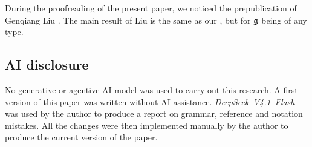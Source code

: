 During the proofreading of the present paper, we noticed the prepublication of Genqiang Liu \cite{liu2026root}. The main result of Liu is the same as our , but for $\mathfrak g$ being of any type. 

\subsection{AI disclosure}

No generative or agentive AI model was used to carry out this research. A first version of this paper was written without AI assistance. \emph{DeepSeek~V4.1~Flash} was used by the author to produce a report on grammar, reference and notation mistakes. All the changes were then implemented manually by the author to produce the current version of the paper.